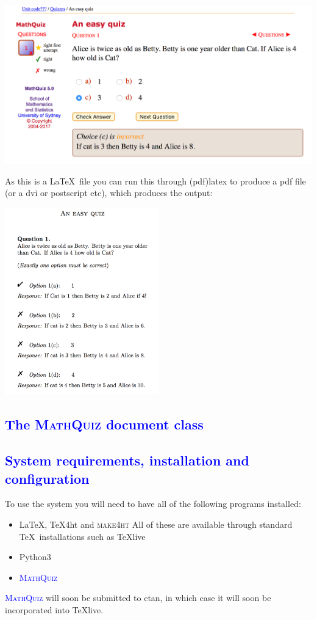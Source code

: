 \documentclass[svgnames]{article}
\newcommand\Section[1]{\subsection{\textcolor{blue}{#1}}}
\def\MathQuiz{\textcolor{blue}{\textsc{MathQuiz}}\xspace}
\begin{document}
    \includegraphics[width=\textwidth]{easy_quiz-html}

    As this is a \LaTeX\ file you can run this through (pdf)latex to
    produce a pdf file (or a dvi or postscript etc), which produces
    the output:

    \includegraphics[width=0.5\textwidth]{easy_quiz}

    \Section{The \MathQuiz document class}
    \Section{System requirements, installation and configuration}

    To use the system you will need to have all of the following programs installed:
    \begin{itemize}
         \item \LaTeX, \TeX 4ht and \textsc{make4ht}
         All of these are available through standard \TeX\ installations
         such as \TeX live
         \item Python3
         \item \MathQuiz
    \end{itemize}

    \MathQuiz will soon be submitted to ctan, in which case it will soon
    be incorporated into \TeX live.
\end{document}

